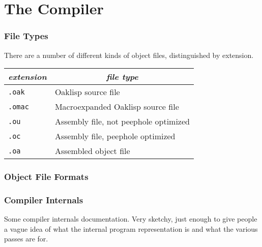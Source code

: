 \chapter{The Compiler}

\subsection{File Types}

There are a number of different kinds of object files, distinguished
by extension.

\begin{center}
\begin{tabular}{l|l}
{\em extension} & \multicolumn{1}{c}{\em file type} \\\hline
\tt .oak  & Oaklisp source file \\
\tt .omac & Macroexpanded Oaklisp source file \\
\tt .ou   & Assembly file, not peephole optimized \\
\tt .oc   & Assembly file, peephole optimized \\
\tt .oa   & Assembled object file
\end{tabular}
\end{center}





\subsection{Object File Formats}


\subsection{Compiler Internals}

Some compiler internals documentation.  Very sketchy, just enough to
give people a vague idea of what the internal program representation
is and what the various passes are for.
